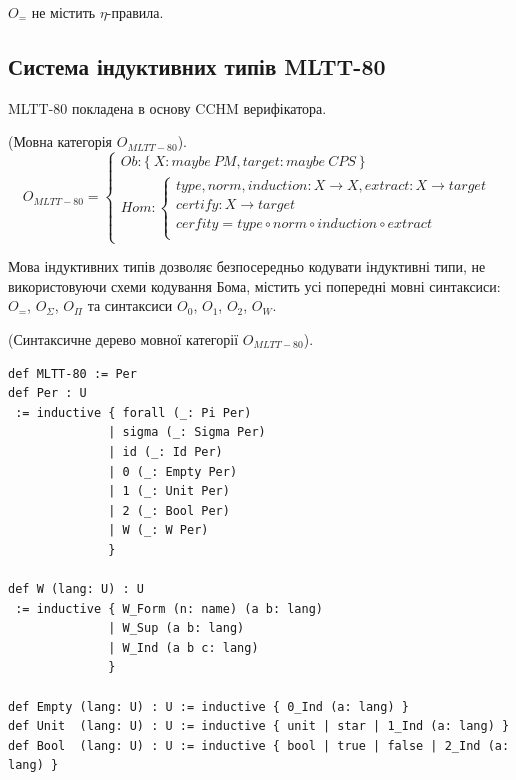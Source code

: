 $O_=$ не містить $\eta$-правила.

\newpage
\subsection{Система індуктивних типів MLTT-80}

MLTT-80 покладена в основу CCHM верифікатора.

\begin{definition} (Мовна категорія $O_{MLTT-80}$).
\begin{equation}
O_{MLTT-80} =
\begin{cases}
Ob: \{\ X: maybe\ PM, target: maybe\ CPS\ \} \\
Hom: \begin{cases}
type,norm,induction: X \rightarrow X, extract: X \rightarrow target \\
certify : X \rightarrow target \\
cerfity = type \circ norm \circ induction \circ extract \\
\end{cases}
\end{cases}
\end{equation}
\end{definition}

Мова індуктивних типів дозволяє безпосередньо кодувати індуктивні типи,
не використовуючи схеми кодування Бома, містить усі попередні мовні синтаксиси:
$O_=$, $O_\Sigma$, $O_\Pi$ та синтаксиси $O_0$, $O_1$, $O_2$, $O_W$.

\begin{definition} (Синтаксичне дерево мовної категорії $O_{MLTT-80}$).
\begin{lstlisting}
def MLTT-80 := Per
def Per : U
 := inductive { forall (_: Pi Per)
              | sigma (_: Sigma Per)
              | id (_: Id Per)
              | 0 (_: Empty Per)
              | 1 (_: Unit Per)
              | 2 (_: Bool Per)
              | W (_: W Per)
              }

def W (lang: U) : U
 := inductive { W_Form (n: name) (a b: lang)
              | W_Sup (a b: lang)
              | W_Ind (a b c: lang)
              }

def Empty (lang: U) : U := inductive { 0_Ind (a: lang) }
def Unit  (lang: U) : U := inductive { unit | star | 1_Ind (a: lang) }
def Bool  (lang: U) : U := inductive { bool | true | false | 2_Ind (a: lang) }

\end{lstlisting}
\end{definition}

